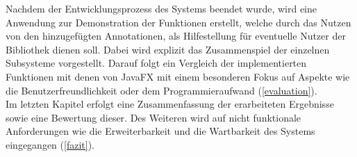 Nachdem der Entwicklungsprozess des Systems beendet wurde, wird eine Anwendung zur Demonstration der Funktionen erstellt, welche durch das Nutzen von den hinzugefügten Annotationen, als Hilfestellung für eventuelle Nutzer der Bibliothek dienen soll. Dabei wird explizit das Zusammenspiel der einzelnen Subsysteme vorgestellt. Darauf folgt ein Vergleich der implementierten Funktionen mit denen von JavaFX mit einem besonderen Fokus auf Aspekte wie die Benutzerfreundlichkeit oder dem Programmieraufwand (\ref{evaluation}).\\
Im letzten Kapitel erfolgt eine Zusammenfassung der erarbeiteten Ergebnisse sowie eine Bewertung dieser. Des Weiteren wird auf nicht funktionale Anforderungen wie die Erweiterbarkeit und die Wartbarkeit des Systems eingegangen (\ref{fazit}).